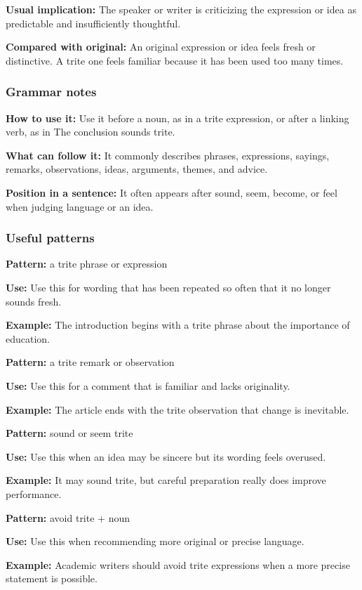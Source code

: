 \documentclass[11pt]{article}
\begin{document}
\textbf{Usual implication:} The speaker or writer is criticizing the expression or idea as predictable and insufficiently thoughtful.

\textbf{Compared with original:} An original expression or idea feels fresh or distinctive. A trite one feels familiar because it has been used too many times.

\subsubsection{Grammar notes}
\textbf{How to use it:} Use it before a noun, as in a trite expression, or after a linking verb, as in The conclusion sounds trite.

\textbf{What can follow it:} It commonly describes phrases, expressions, sayings, remarks, observations, ideas, arguments, themes, and advice.

\textbf{Position in a sentence:} It often appears after sound, seem, become, or feel when judging language or an idea.

\subsubsection{Useful patterns}
\textbf{Pattern:} a trite phrase or expression

\textbf{Use:} Use this for wording that has been repeated so often that it no longer sounds fresh.

\textbf{Example:} The introduction begins with a trite phrase about the importance of education.

\textbf{Pattern:} a trite remark or observation

\textbf{Use:} Use this for a comment that is familiar and lacks originality.

\textbf{Example:} The article ends with the trite observation that change is inevitable.

\textbf{Pattern:} sound or seem trite

\textbf{Use:} Use this when an idea may be sincere but its wording feels overused.

\textbf{Example:} It may sound trite, but careful preparation really does improve performance.

\textbf{Pattern:} avoid trite + noun

\textbf{Use:} Use this when recommending more original or precise language.

\textbf{Example:} Academic writers should avoid trite expressions when a more precise statement is possible.
\end{document}
